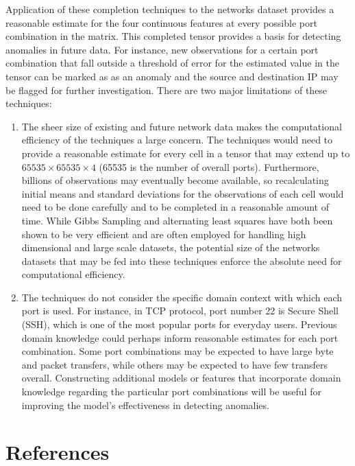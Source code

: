 \documentclass[12pt,twoside]{dukestatscithesis}
\theoremstyle{definition}
\theoremstyle{definition}
\theoremstyle{definition}
\theoremstyle{remark}
\begin{document}
Application of these completion techniques to the networks dataset
provides a reasonable estimate for the four continuous features at every
possible port combination in the matrix. This completed tensor provides
a basis for detecting anomalies in future data. For instance, new
observations for a certain port combination that fall outside a
threshold of error for the estimated value in the tensor can be marked
as as an anomaly and the source and destination IP may be flagged for
further investigation. There are two major limitations of these
techniques:
\begin{enumerate}
\def\labelenumi{\arabic{enumi}.}
\item
  The sheer size of existing and future network data makes the
  computational efficiency of the techniques a large concern. The
  techniques would need to provide a reasonable estimate for every cell
  in a tensor that may extend up to \(65535 \times 65535 \times 4\)
  (65535 is the number of overall ports). Furthermore, billions of
  observations may eventually become available, so recalculating initial
  means and standard deviations for the observations of each cell would
  need to be done carefully and to be completed in a reasonable amount
  of time. While Gibbs Sampling and alternating least squares have both
  been shown to be very efficient and are often employed for handling
  high dimensional and large scale datasets, the potential size of the
  networks datasets that may be fed into these techniques enforce the
  absolute need for computational efficiency.
\item
  The techniques do not consider the specific domain context with which
  each port is used. For instance, in TCP protocol, port number 22 is
  Secure Shell (SSH), which is one of the most popular ports for
  everyday users. Previous domain knowledge could perhaps inform
  reasonable estimates for each port combination. Some port combinations
  may be expected to have large byte and packet transfers, while others
  may be expected to have few transfers overall. Constructing additional
  models or features that incorporate domain knowledge regarding the
  particular port combinations will be useful for improving the model's
  effectiveness in detecting anomalies.
\end{enumerate}
\backmatter

\chapter*{References}\label{references}
\end{document}
